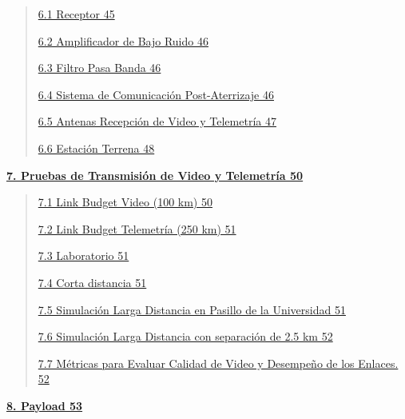 \documentclass[12pt,a4paper]{article}
\begin{document}
\begin{quote}
\hyperref[receptor]{6.1 Receptor 45}

\hyperref[amplificador-de-bajo-ruido-1]{6.2 Amplificador de Bajo Ruido 46}

\hyperref[filtro-pasa-banda]{6.3 Filtro Pasa Banda 46}

\hyperref[sistema-de-comunicaciuxf3n-post-aterrizaje]{6.4 Sistema de Comunicación Post-Aterrizaje 46}

\hyperref[antenas-recepciuxf3n-de-video-y-telemetruxeda]{6.5 Antenas Recepción de Video y Telemetría 47}

\hyperref[estaciuxf3n-terrena]{6.6 Estación Terrena 48}
\end{quote}

\hyperref[pruebas-de-transmisiuxf3n-de-video-y-telemetruxeda]{\textbf{7. Pruebas de Transmisión de Video y Telemetría 50}}

\begin{quote}
\hyperref[link-budget-video-100-km]{7.1 Link Budget Video (100 km) 50}

\hyperref[link-budget-telemetruxeda-250-km]{7.2 Link Budget Telemetría (250 km) 51}

\hyperref[laboratorio]{7.3 Laboratorio 51}

\hyperref[corta-distancia]{7.4 Corta distancia 51}

\hyperref[simulaciuxf3n-larga-distancia-en-pasillo-de-la-universidad]{7.5 Simulación Larga Distancia en Pasillo de la Universidad 51}

\hyperref[simulaciuxf3n-larga-distancia-con-separaciuxf3n-de-2.5-km]{7.6 Simulación Larga Distancia con separación de 2.5 km 52}

\hyperref[muxe9tricas-para-evaluar-calidad-de-video-y-desempeuxf1o-de-los-enlaces.]{7.7 Métricas para Evaluar Calidad de Video y Desempeño de los Enlaces. 52}
\end{quote}

\hyperref[payload]{\textbf{8. Payload 53}}
\end{document}

